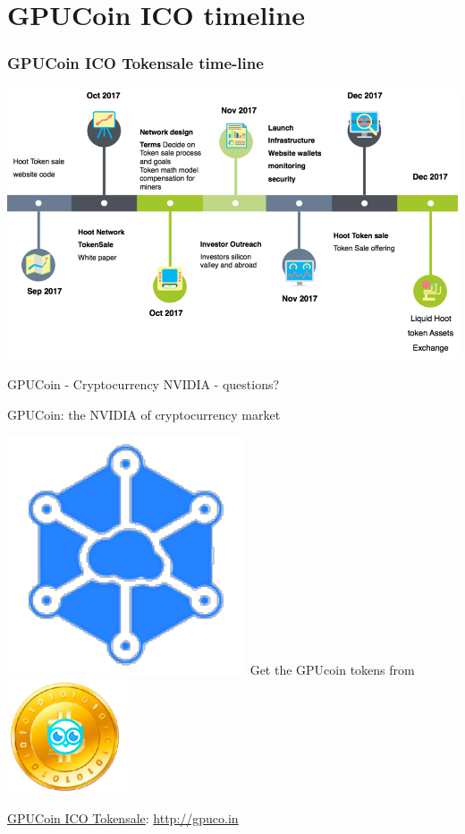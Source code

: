 \documentclass[10pt]{beamer}
\begin{document}
\section{GPUCoin ICO timeline}
\begin{frame}[t]\frametitle{GPUCoin ICO Tokensale time-line}
  \includegraphics[width=1.0\textwidth]{static/tstimeline-trans}
\end{frame}

\begin{frame}[standout]{GPUCoin - Cryptocurrency NVIDIA -  questions?}
\begin{center}
GPUCoin: the NVIDIA of cryptocurrency market 
\end{center}


\includegraphics[scale=.5]{static/ipcn-p2p}
Get the GPUcoin tokens from
\includegraphics[scale=0.5]{static/hootcoin} 


 \begin{center}
\href{https://j.mp/gpucoins}{GPUCoin ICO Tokensale}: 
\url{http://gpuco.in}
 \end{center}


 \begin{center}\ccbysa\end{center}

\end{frame}
\end{document}
